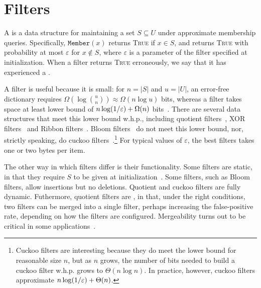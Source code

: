 
\section{Filters}




A  is a data structure for maintaining a set $S\subseteq U$ under approximate membership queries.  Specifically, $\texttt{Member}(x)$ returns \textsc{True} if $x\in S$, and returns \textsc{True} with probability at most $\varepsilon$ for $x\notin S$, where $\varepsilon$ is a parameter of the filter specified at initialization.  When a filter returns \textsc{True} erroneously, we say that it has experienced a .   

A filter is useful because it is small: for $n= |S|$ and $u = |U|$, an error-free dictionary requires $\Omega(\log {u\choose n})
\approx \Omega(n \log u)$ bits, whereas a filter  takes space at least  lower bound of $n\log (1/\varepsilon) + \Omega(n)$
bits~\cite{CarterFG78}.  There are several data structures that meet this lower bound w.h.p., including quotient filters~\cite{Cleary84,PaghPaRa05,DillingerMa09,BenderFaJo12a,PandeyBJP17,pandeySigmod21}, XOR
filters~\cite{GrafLe20} and Ribbon filters~\cite{DillingerWalzer21}.  Bloom filters~\cite{Bloom70} do not meet this lower bound, nor, strictly speaking, do cuckoo filters~\cite{FanAnKa14,BreslowJ18}.\footnote{Cuckoo filters are interesting because they do meet the lower bound for reasonable size $n$, but as $n$ grows, the number of bits needed to build a cuckoo filter w.h.p. grows to $\Theta(n\log n)$.  In practice, however, cuckoo filters approximate $n\log (1/\varepsilon) + \Theta(n)$.}
%
For typical values of $\varepsilon$, the best filters takes one or two bytes per item.

The other way in which filters differ is their functionality. Some filters are static, in that they require $S$ to be given at initialization~\cite{GrafLe20m,DillingerWalzer21}.  Some filters, such as Bloom filters, allow insertions but no deletions.  Quotient and cuckoo filters are fully dynamic.  Futhermore, quotient filters are , in that, under the right conditions, two filters can be merged into a single filter, perhaps increasing the false-positive rate, depending on how the filters are configured.  Mergeability turns out to be critical in some applications~\cite{conway2020splinterdb}.  


